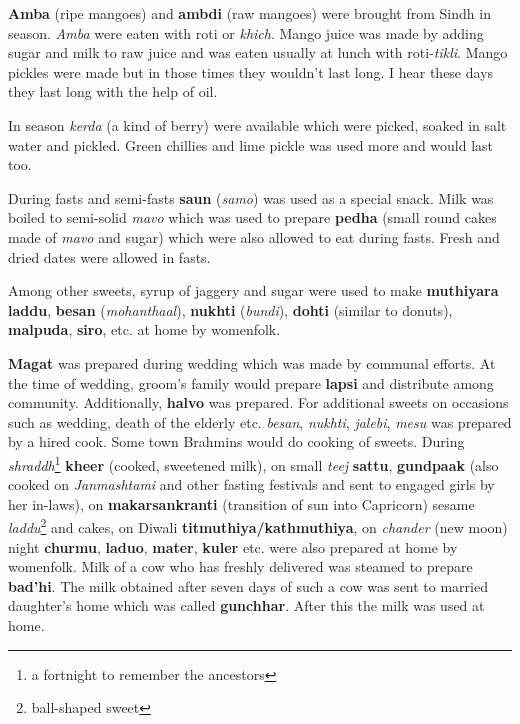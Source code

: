\textbf{Amba} (ripe mangoes) and \textbf{ambdi} (raw mangoes) were brought from
Sindh in season. \textit{Amba} were eaten with roti or \textit{khich}. Mango
juice was made by adding sugar and milk to raw juice and was eaten usually at
lunch with roti-\textit{tikli}. Mango pickles were made but in those times they
wouldn't last long. I hear these days they last long with the help of oil.

In season \textit{kerda} (a kind of berry) were available which were picked,
soaked in salt water and pickled. Green chillies and lime pickle was used more
and would last too.

During fasts and semi-fasts \textbf{saun} (\textit{samo}) was used as a special
snack. Milk was boiled to semi-solid \textit{mavo} which was used to prepare
\textbf{pedha} (small round cakes made of \textit{mavo} and sugar) which were
also allowed to eat during fasts. Fresh and dried dates were allowed in fasts.

Among other sweets, syrup of jaggery and sugar were used to make
\textbf{muthiyara laddu}, \textbf{besan} (\textit{mohanthaal}), \textbf{nukhti}
(\textit{bundi}), \textbf{dohti} (similar to donuts), \textbf{malpuda},
\textbf{siro}, etc. at home by womenfolk.

\textbf{Magat} was prepared during wedding which was made by communal efforts.
At the time of wedding, groom's family would prepare \textbf{lapsi} and
distribute among community. Additionally, \textbf{halvo} was prepared. For
additional sweets on occasions such as wedding, death of the elderly etc. \textit{besan},
\textit{nukhti}, \textit{jalebi}, \textit{mesu} was prepared by a
hired cook. Some town Brahmins would do cooking of sweets. During
\textit{shraddh}\footnote{a fortnight to remember the ancestors}
\textbf{kheer} (cooked, sweetened milk), on small \textit{teej}
\textbf{sattu}, \textbf{gundpaak} (also cooked on
\textit{Janmashtami} and other fasting festivals and sent to
engaged girls by her in-laws), on
\textbf{makarsankranti} (transition of sun into Capricorn) sesame
\textit{laddu}\footnote{ball-shaped sweet} and cakes, on Diwali \textbf{titmuthiya/kathmuthiya},
on \textit{chander} (new moon) night \textbf{churmu},
\textbf{laduo}, \textbf{mater}, \textbf{kuler} etc. were also
prepared at home by womenfolk. Milk of a cow who has freshly delivered was
steamed to prepare \textbf{bad'hi}. The milk obtained after seven days of such
a cow was sent to married daughter's home which was called \textbf{gunchhar}.
After this the milk was used at home. 


